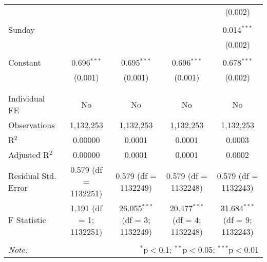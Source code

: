 \documentclass[
]{article}
\begin{document}
\begin{table}[!htbp]
{\begin{tabular}{@{\extracolsep{5pt}}lcccc}
  &  &  &  & (0.002) \\ 
  & & & & \\ 
 Sunday &  &  &  & 0.014$^{***}$ \\ 
  &  &  &  & (0.002) \\ 
  & & & & \\ 
 Constant & 0.696$^{***}$ & 0.695$^{***}$ & 0.696$^{***}$ & 0.678$^{***}$ \\ 
  & (0.001) & (0.001) & (0.001) & (0.002) \\ 
  & & & & \\ 
\hline \\[-1.8ex] 
Individual FE & No & No & No & No \\ 
Observations & 1,132,253 & 1,132,253 & 1,132,253 & 1,132,253 \\ 
R$^{2}$ & 0.00000 & 0.0001 & 0.0001 & 0.0003 \\ 
Adjusted R$^{2}$ & 0.00000 & 0.0001 & 0.0001 & 0.0002 \\ 
Residual Std. Error & 0.579 (df = 1132251) & 0.579 (df = 1132249) & 0.579 (df = 1132248) & 0.579 (df = 1132243) \\ 
F Statistic & 1.191 (df = 1; 1132251) & 26.055$^{***}$ (df = 3; 1132249) & 20.477$^{***}$ (df = 4; 1132248) & 31.684$^{***}$ (df = 9; 1132243) \\ 
\hline 
\hline \\[-1.8ex] 
\textit{Note:}  & \multicolumn{4}{r}{$^{*}$p$<$0.1; $^{**}$p$<$0.05; $^{***}$p$<$0.01} \\ 
\end{tabular}
} 
\end{table} 
\newpage
\end{document}
